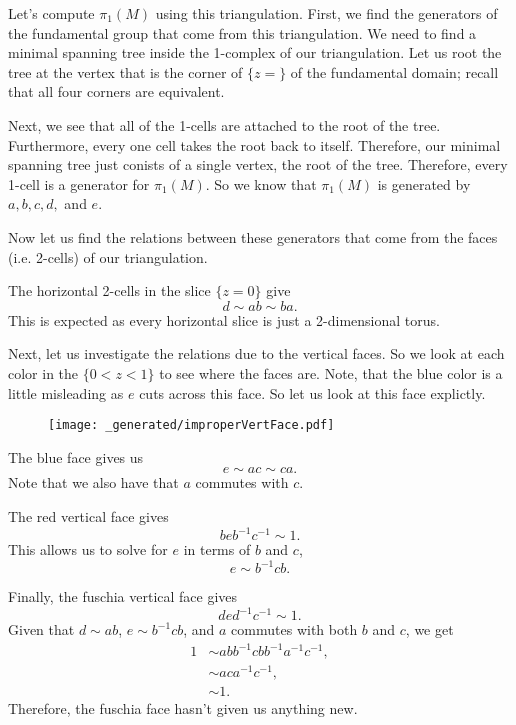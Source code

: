 Let's compute \(\pi_1(M)\) using this triangulation. First, we find the generators of the fundamental group that come from this
triangulation. We need to find a minimal spanning tree inside the 1-complex of our triangulation. Let us root the tree at the
vertex that is the corner of \(\{z = \}\) of the fundamental domain; recall that all four corners are equivalent.

Next, we see that all of the 1-cells are attached to the root of the tree. Furthermore, every one cell takes the root back to itself. Therefore,
our minimal spanning tree just conists of a single vertex, the root of the tree. Therefore, every 1-cell is a generator for \(\pi_1(M)\). So
we know that \(\pi_1(M)\) is generated by \(a, b, c, d,\) and \(e\).

Now let us find the relations between these generators that come from the faces (i.e. 2-cells) of our triangulation.

The horizontal 2-cells in the slice \(\{z = 0\}\) give 
\begin{equation}
d \sim ab \sim ba. 
\end{equation}
This is expected as every horizontal slice is just a 2-dimensional torus.

Next, let us investigate the relations due to the vertical faces. So we look at each color in the \(\{0 < z < 1\}\) to see where the faces are.
Note, that the blue color is a little misleading as \(e\) cuts across this face. So let us look at this face explictly.
\begin{figure}[H]
\centering
\texttt{[image: \_generated/improperVertFace.pdf]}
\end{figure}
The blue face gives us
\begin{equation}
e \sim ac \sim ca.
\end{equation}
Note that we also have that \(a\) commutes with \(c\).

The red vertical face gives
\begin{equation}
beb^{-1}c^{-1} \sim 1.
\end{equation}
This allows us to solve for \(e\) in terms of \(b\) and \(c\),
\begin{equation}
e \sim b^{-1}cb.
\end{equation}

Finally, the fuschia vertical face gives
\begin{equation}
ded^{-1}c^{-1} \sim 1.
\end{equation}
Given that \(d \sim ab\), \(e\sim b^{-1}cb\), and \(a\) commutes with both \(b\) and \(c\), we get
\begin{align}
1 & \sim abb^{-1}cbb^{-1}a^{-1}c^{-1}, \\
& \sim aca^{-1}c^{-1}, \\
& \sim 1.
\end{align}
Therefore, the fuschia face hasn't given us anything new.

